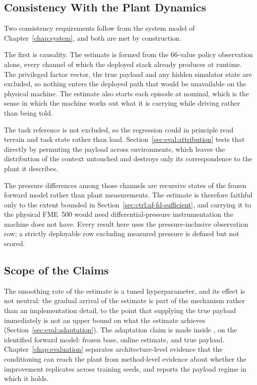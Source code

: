 \subsection{Consistency With the Plant Dynamics}
\label{sec:ctrl:af-consistency}

Two consistency requirements follow from the system model of
Chapter~\ref{chap:system}, and both are met by construction.

The first is causality. The estimate is formed from the $66$-value policy
observation alone, every channel of which the deployed stack already produces at
runtime. The privileged factor vector, the true payload and any hidden simulator
state are excluded, so nothing enters the deployed path that would be
unavailable on the physical machine. The estimate also starts each episode at
nominal, which is the sense in which the machine works out what it is carrying
while driving rather than being told.

The task reference is not excluded, so the regression could in principle read
terrain and task state rather than load.
Section~\ref{sec:eval:attribution} tests that directly by permuting the payload
across environments, which leaves the distribution of the context untouched and
destroys only its correspondence to the plant it describes.

The pressure differences among those channels are recursive states of the frozen
forward model rather than plant measurements. The estimate is therefore faithful
only to the extent bounded in Section~\ref{sec:ctrl:af-fd-sufficient}, and
carrying it to the physical FME~500 would need differential-pressure
instrumentation the machine does not have. Every result here uses the
pressure-inclusive observation row; a strictly deployable row excluding measured
pressure is defined but not scored.

\subsection{Scope of the Claims}
\label{sec:ctrl:af-claims}

The smoothing rate of the estimate is a tuned hyperparameter, and its effect is
not neutral: the gradual arrival of the estimate is part of the mechanism rather
than an implementation detail, to the point that supplying the true payload
immediately is not an upper bound on what the estimate achieves
(Section~\ref{sec:eval:adaptation}).
The adaptation claim is made inside \ppoAAMFD{}, on the identified forward
model: frozen base, online estimate, and true payload. Chapter~\ref{chap:evaluation}
separates architecture-level evidence that the conditioning can reach the plant
from method-level evidence about whether the improvement replicates across
training seeds, and reports the payload regime in which it holds.

